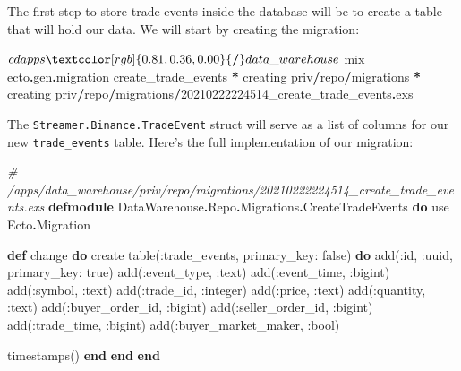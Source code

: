 \documentclass[
]{book}
\newenvironment{Shaded}{\begin{snugshade}}{\end{snugshade}}
\newcommand{\CommentTok}[1]{\textcolor[rgb]{0.56,0.35,0.01}{\textit{#1}}}
\newcommand{\ConstantTok}[1]{\textcolor[rgb]{0.00,0.00,0.00}{#1}}
\newcommand{\DecValTok}[1]{\textcolor[rgb]{0.00,0.00,0.81}{#1}}
\newcommand{\ImportTok}[1]{#1}
\newcommand{\KeywordTok}[1]{\textcolor[rgb]{0.13,0.29,0.53}{\textbf{#1}}}
\newcommand{\NormalTok}[1]{#1}
\newcommand{\OperatorTok}[1]{\textcolor[rgb]{0.81,0.36,0.00}{\textbf{#1}}}
\newcommand{\VariableTok}[1]{\textcolor[rgb]{0.00,0.00,0.00}{#1}}
\begin{document}
The first step to store trade events inside the database will be to create a table that will hold our data. We will start by creating the migration:

\begin{Shaded}
\begin{Highlighting}[]
\NormalTok{$ cd apps}\OperatorTok{/}\NormalTok{data\_warehouse}
\NormalTok{$ mix ecto}\OperatorTok{.}\NormalTok{gen}\OperatorTok{.}\NormalTok{migration create\_trade\_events}
\OperatorTok{*}\NormalTok{ creating priv}\OperatorTok{/}\NormalTok{repo}\OperatorTok{/}\NormalTok{migrations}
\OperatorTok{*}\NormalTok{ creating priv}\OperatorTok{/}\NormalTok{repo}\OperatorTok{/}\NormalTok{migrations}\OperatorTok{/}\DecValTok{2}\NormalTok{0210222224514\_create\_trade\_events}\OperatorTok{.}\NormalTok{exs}
\end{Highlighting}
\end{Shaded}

The \texttt{Streamer.Binance.TradeEvent} struct will serve as a list of columns for our new \texttt{trade\_events} table. Here's the full implementation of our migration:

\begin{Shaded}
\begin{Highlighting}[]
\CommentTok{\# /apps/data\_warehouse/priv/repo/migrations/20210222224514\_create\_trade\_events.exs}
\KeywordTok{defmodule} \ConstantTok{DataWarehouse}\OperatorTok{.}\ConstantTok{Repo}\OperatorTok{.}\ConstantTok{Migrations}\OperatorTok{.}\ConstantTok{CreateTradeEvents} \KeywordTok{do}
  \ImportTok{use} \ConstantTok{Ecto}\OperatorTok{.}\ConstantTok{Migration}

  \KeywordTok{def}\NormalTok{ change }\KeywordTok{do}
\NormalTok{    create table(}\VariableTok{:trade\_events}\NormalTok{, }\VariableTok{primary\_key:} \ConstantTok{false}\NormalTok{) }\KeywordTok{do}
\NormalTok{      add(}\VariableTok{:id}\NormalTok{, }\VariableTok{:uuid}\NormalTok{, }\VariableTok{primary\_key:} \ConstantTok{true}\NormalTok{)}
\NormalTok{      add(}\VariableTok{:event\_type}\NormalTok{, }\VariableTok{:text}\NormalTok{)}
\NormalTok{      add(}\VariableTok{:event\_time}\NormalTok{, }\VariableTok{:bigint}\NormalTok{)}
\NormalTok{      add(}\VariableTok{:symbol}\NormalTok{, }\VariableTok{:text}\NormalTok{)}
\NormalTok{      add(}\VariableTok{:trade\_id}\NormalTok{, }\VariableTok{:integer}\NormalTok{)}
\NormalTok{      add(}\VariableTok{:price}\NormalTok{, }\VariableTok{:text}\NormalTok{)}
\NormalTok{      add(}\VariableTok{:quantity}\NormalTok{, }\VariableTok{:text}\NormalTok{)}
\NormalTok{      add(}\VariableTok{:buyer\_order\_id}\NormalTok{, }\VariableTok{:bigint}\NormalTok{)}
\NormalTok{      add(}\VariableTok{:seller\_order\_id}\NormalTok{, }\VariableTok{:bigint}\NormalTok{)}
\NormalTok{      add(}\VariableTok{:trade\_time}\NormalTok{, }\VariableTok{:bigint}\NormalTok{)}
\NormalTok{      add(}\VariableTok{:buyer\_market\_maker}\NormalTok{, }\VariableTok{:bool}\NormalTok{)}

\NormalTok{      timestamps()}
    \KeywordTok{end}
  \KeywordTok{end}
\KeywordTok{end}
\end{Highlighting}
\end{Shaded}
\end{document}
